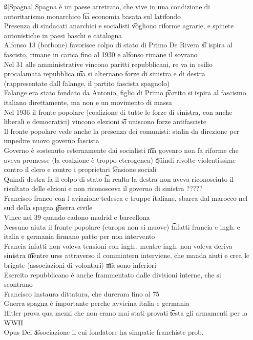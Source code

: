 \documentclass[12pt]{article}
\begin{document}
\ss[Spagna]
Spagna è un paese arretrato, che vive in una condizione di autoritarismo monarchico \t ha economia basata sul latifondo \\
Presenza di sindacati anarchici e socialisti \t vogliono riforme agrarie, e spinete autonistiche in paesi baschi e catalogna \\
Alfonso 13 (borbone) favorisce colpo di stato di Primo De Rivera \t si ispira al fascisto, rimane in carica fino al 1930 e alfonso rimane il sovrano \\
Nel 31 alle amministrative vincono paritti repubblicani, re va in esilio procalamata repubblica \t ma si alternano forze di sinistra e di destra (rappresentate dall falange, il partito fascista spagnolo) \\
Falange era stato fondato da Antonio, figlio di Primo \t partito si ispira al fascismo italiano direttamente, ma non e un movimento di massa \\
Nel 1936 il fronte popolare (coalizione di tutte le forze di sinistra, con anche liberali e democratici) vincono elezioni \t si uniscono forze antifasciste \\
Il fronte popolare vede anche la presenza dei comunisti: stalin da direzione per impedire nuovo governo fascista \\
Governo è sostenuto esternamente dai socialisti \t ma govenro non fa riforme che aveva promesse (la coalzione è troppo eterogenea) \t quindi rivolte violentissime contro il clero e contro i proprietari \t tensione sociali \\
Quindi destra fa il colpo di stato \t in realta la destra non aveva riconosciuto il risultato delle elzioni e non riconosceva il governo di sinistra ????? \\
Francisco franco con l aviazione tedesca e truppe italiane, sbarca dal marocco nel sud della spagna \t guerra civile \\
Vince nel 39 quando cadono madrid e barcellona \\
Nessuno aiuta il fronte popolare (europa non si muove) \t infatti francia e ingh. e italia e germania firmano patto per non intervento \\
Francia infatti non voleva tensioni con ingh., mentre ingh. non voleva deriva sinistra \t mentre urss attraverso il commintern interviene, che manda aiuti e crea le brigate (associazioni di volontari) \t ma sono inferiori \\
Esercito repubblicano è anche frammentato dalle divisioni interne, che si scontrano \\
Francisco instaura dittatura, che durerara fino al 75 \\
Guerra spagna è importante perche avvicina italia e germania \\
Hitler prova qua mezzi che non erano mai stati provati \t testa gli armamenti per la WWII \\
Opus Dei \t associazione il cui fondatore ha simpatie franchiste prob.
\end{document}
